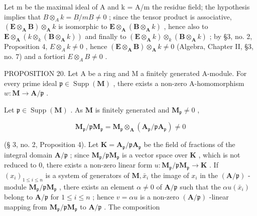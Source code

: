 Let m be the maximal ideal of A and k = A/m the residue field; the hypothesis implies that \(B \otimes_{A} k = B/mB \neq 0\) ; since the tensor product is associative, \((\mathbf{E} \otimes_{\mathbf{A}} \mathbf{B}) \otimes_{\mathbf{A}} k\) is isomorphic to \(\mathbf{E} \otimes_{\mathbf{A}} (\mathbf{B} \otimes_{\mathbf{A}} k)\) , hence also to \(\mathbf{E} \otimes_{\mathbf{A}} (k \otimes_{k} (\mathbf{B} \otimes_{\mathbf{A}} k))\) and finally to \((\mathbf{E} \otimes_{\mathbf{A}} k) \otimes_{k} (\mathbf{B} \otimes_{\mathbf{A}} k)\) ; by §3, no. 2, Proposition 4, \(E \otimes_{A} k \neq 0\) , hence \((\mathbf{E} \otimes_{\mathbf{A}} \mathbf{B}) \otimes_{\mathbf{A}} k \neq 0\) (Algebra, Chapter II, §3, no. 7) and a fortiori \(E \otimes_{A} B \neq 0\) .

PROPOSITION 20. Let A be a ring and M a finitely generated A-module. For every prime ideal \(\mathfrak{p} \in \operatorname{Supp}(\mathbf{M})\) , there exists a non-zero A-homomorphism \(w: \mathbf{M} \to \mathbf{A}/\mathfrak{p}\) .

Let \(\mathfrak{p} \in \operatorname{Supp}(\mathbf{M})\) . As \(\mathbf{M}\) is finitely generated and \(\mathbf{M}_{\mathfrak{p}} \neq 0\) ,

\[
\mathbf {M} _ {\mathfrak {p}} / \mathfrak {p} \mathbf {M} _ {\mathfrak {p}} = \mathbf {M} _ {\mathfrak {p}} \otimes_ {\mathbf {A}} (\mathbf {A} _ {\mathfrak {p}} / \mathfrak {p} \mathbf {A} _ {\mathfrak {p}}) \neq 0
\]

(§ 3, no. 2, Proposition 4). Let \(\mathbf{K} = \mathbf{A}_{\mathfrak{p}} / \mathfrak{p}\mathbf{A}_{\mathfrak{p}}\) be the field of fractions of the integral domain \(\mathbf{A} / \mathfrak{p}\) ; since \(\mathbf{M}_{\mathfrak{p}} / \mathfrak{p}\mathbf{M}_{\mathfrak{p}}\) is a vector space over \(\mathbf{K}\) , which is not reduced to 0, there exists a non-zero linear form \(u: \mathbf{M}_{\mathfrak{p}} / \mathfrak{p}\mathbf{M}_{\mathfrak{p}} \to \mathbf{K}\) . If \((x_{i})_{1 \leqslant i \leqslant n}\) is a system of generators of \(\mathbf{M}, \bar{x}_{i}\) the image of \(x_{i}\) in the \((\mathbf{A} / \mathfrak{p})\) -module \(\mathbf{M}_{\mathfrak{p}} / \mathfrak{p}\mathbf{M}_{\mathfrak{p}}\) , there exists an element \(\alpha \neq 0\) of \(\mathbf{A} / \mathfrak{p}\) such that the \(\alpha u(\bar{x}_i)\) belong to \(\mathbf{A} / \mathfrak{p}\) for \(1 \leqslant i \leqslant n\) ; hence \(v = \alpha u\) is a non-zero \((\mathbf{A} / \mathfrak{p})\) -linear mapping from \(\mathbf{M}_{\mathfrak{p}} / \mathfrak{p}\mathbf{M}_{\mathfrak{p}}\) to \(\mathbf{A} / \mathfrak{p}\) . The composition

